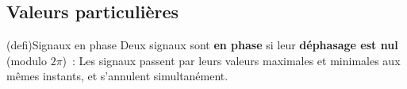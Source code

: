 \documentclass[../../main/main.tex]{subfiles}
\begin{document}
\subsection{Valeurs particulières}
\begin{tcb}[sidebyside, righthand ratio=.3](defi){Signaux en phase}
	Deux signaux sont \textbf{en phase} si leur \textbf{déphasage est nul}
	(modulo $2\pi$)~:
	\psw{%
		\[
			\D\f \equiv 0\quad[2\pi]
			\Lra
			\boxed{\D\f = 2p\pi} \quad p \in \Zb
		\]
	}%
	Les signaux passent par leurs valeurs maximales et minimales aux mêmes
	instants, et s'annulent simultanément.
	\tcblower
	\begin{center}
		\vspace{-15pt}
	\end{center}
\end{tcb}
\end{document}
